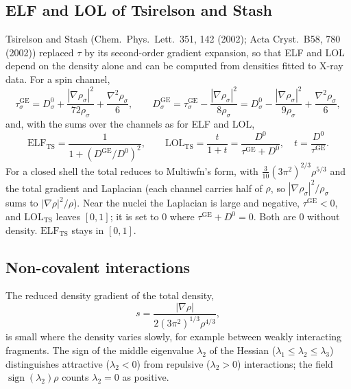 \documentclass[11pt,a4paper]{article}
\begin{document}
\subsection{ELF and LOL of Tsirelson and Stash}
Tsirelson and Stash (Chem.\ Phys.\ Lett.\ 351, 142 (2002); Acta
Cryst.\ B58, 780 (2002)) replaced $\tau$ by its second-order gradient
expansion, so that ELF and LOL depend on the density alone and can be
computed from densities fitted to X-ray data. For a spin channel,
\begin{equation}
 \tau^{\mathrm{GE}}_\sigma=D^0_\sigma+\frac{|\nabla\rho_\sigma|^2}{72\rho_\sigma}
 +\frac{\nabla^2\rho_\sigma}{6},\qquad
 D^{\mathrm{GE}}_\sigma=\tau^{\mathrm{GE}}_\sigma-\frac{|\nabla\rho_\sigma|^2}{8\rho_\sigma}
 =D^0_\sigma-\frac{|\nabla\rho_\sigma|^2}{9\rho_\sigma}+\frac{\nabla^2\rho_\sigma}{6},
\end{equation}
and, with the sums over the channels as for ELF and LOL,
\begin{equation}
 \mathrm{ELF}_{\mathrm{TS}}=\frac{1}{1+(D^{\mathrm{GE}}/D^0)^2},\qquad
 \mathrm{LOL}_{\mathrm{TS}}=\frac{t}{1+t}=\frac{D^0}{\tau^{\mathrm{GE}}+D^0},\quad
 t=\frac{D^0}{\tau^{\mathrm{GE}}}.
\end{equation}
For a closed shell the total reduces to Multiwfn's form, with
$\frac3{10}(3\pi^2)^{2/3}\rho^{5/3}$ and the total gradient and Laplacian
(each channel carries half of $\rho$, so $|\nabla\rho_\sigma|^2/\rho_\sigma$
sums to $|\nabla\rho|^2/\rho$). Near the nuclei the Laplacian is large and
negative, $\tau^{\mathrm{GE}}<0$, and $\mathrm{LOL}_{\mathrm{TS}}$ leaves
$[0,1]$; it is set to 0 where $\tau^{\mathrm{GE}}+D^0=0$. Both are 0
without density. $\mathrm{ELF}_{\mathrm{TS}}$ stays in $[0,1]$.

\subsection{Non-covalent interactions}
The reduced density gradient of the total density,
\begin{equation}
 s=\frac{|\nabla\rho|}{2(3\pi^2)^{1/3}\rho^{4/3}},
\end{equation}
is small where the density varies slowly, for example between weakly
interacting fragments. The sign of the middle eigenvalue $\lambda_2$ of the
Hessian ($\lambda_1\le\lambda_2\le\lambda_3$) distinguishes attractive
($\lambda_2<0$) from repulsive ($\lambda_2>0$) interactions; the field
$\operatorname{sign}(\lambda_2)\rho$ counts $\lambda_2=0$ as positive.
\end{document}
